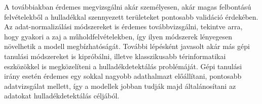 A továbbiakban érdemes megvizsgálni akár személyesen, akár magas felbontású felvételekből a hulladékkal szennyezett területeket pontosabb validáció érdekében. Az adat-normalizálási módszereket is érdemes továbbvizsgálni, tekintve arra, hogy gyakori a zaj a műholdfelvételekben, így ilyen módszerek lényegesen növelhetik a modell megbízhatóságát. További lépésként javasolt akár más gépi tanulási módszereket is kipróbálni, illetve klasszikusabb térinformatikai eszközökkel is megközelíteni a hulladékdetektálás problémáját. Gépi tanulási irány esetén érdemes egy sokkal nagyobb adathalmazt előállítani, pontosabb adatvizsgálat mellett, így a modellek jobban tudják majd általánosítani az adatokat hulladékdetektálás céljából.
